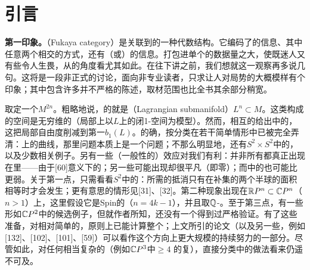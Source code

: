 \chapter*{引言}

\textbf{第一印象。}\textbf{\trFukayaCategory}（Fukaya category）是关联到\trSymplectic\trManifold{}的一种代数结构。它编码了\trLagrange\trSubmanifold{}的信息、其中任意两个相交的方式，还有\trPseudoholomorphic\trDisk（或\trPolygon）的信息。打包进单个\trObject{}的数据量之大，使\trFukayaCategory{}既迷人又有些令人生畏，从\trSymplectic\trTopology{}的角度看尤其如此。在往下讲之前，我们想就这一观察再多说几句。这将是一段非正式的讨论，面向非专业读者，只求让人对局势的大概模样有个印象；其中包含许多并不严格的陈述，取材范围也比全书其余部分稍宽。

取定一个\trSymplectic\trManifold $M^{2n}$。粗略地说，\trFukayaCategory{}的\trObject{}就是\textbf{\trLagrange\trSubmanifold}（Lagrangian submanifold）$L^n \subset M$。这类\trSubmanifold{}构成的空间是无穷维的（局部上以$L$上的闭1-\trForm{}空间为模型）。然而，相互\trHamiltonianIsotopy{}的\trLagrange\trSubmanifold{}给出\trFukayaCategory{}中\trIsomorphic{}的\trObject，这把局部自由度削减到第一\trBettiNumber $b_1(L)$。的确，按\trHamiltonianIsotopy{}分类在若干简单情形中已被完全弄清：\trSurface{}上的曲线，那里问题本质上是一个\trTopology{}问题；不那么明显地，还有$S^2 \times S^2$中的\trLagrange\trSphere [75]，以及少数相关例子。另有一些（一般性的）效应对我们有利：并非所有\trLagrange\trSubmanifold{}都真正出现在\trFukayaCategory{}里——由于[60]意义下的\trObstruction；另一些可能出现却很平凡（即零\trObject）；而\trFukayaCategory{}中的\trIsomorphism{}也可能比\trLagrange\trIsotopy{}更弱。关于第一点，只需看看$S^2$中的\trCircle：所需的\trObstruction{}抵消只有在补集的两个半球的面积相等时才会发生；更有意思的情形见[31]、[32]。第二种现象出现在\trRealLocus{}$\mathbb{R}P^n \subset \mathbb{C}P^n$（$n>1$）上，这里假设它是Spin的（$n=4k-1$），并且\trFukayaCategory{}取$\mathbb{Q}$-\trCoefficients。至于第三点，有一些形如$\mathbb{C}P^2$中\trLagrange\trTorus{}的候选例子，但就作者所知，还没有一个得到过严格验证。有了这些准备，对\trSymplectic\trTopology{}相对简单的\trManifold，原则上已能计算整个\trFukayaCategory；上文所引的论文（以及另一些，例如[132]、[102]、[101]、[59]）可以看作这个方向上更大规模的持续努力的一部分。尽管如此，对任何相当复杂的\trSymplectic\trManifold（例如$\mathbb{C}P^3$中\trDegree $\geq 4$ 的复\trHypersurface），直接分类\trFukayaCategory{}中\trObject{}的做法看来仍遥不可及。

